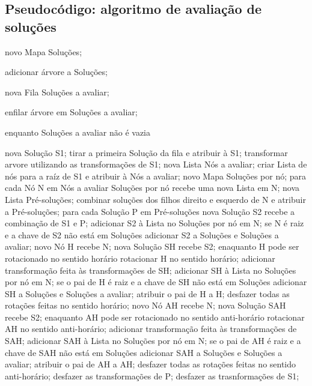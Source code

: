 \begin{anexosenv}

\partanexos

\chapter{Pseudocódigo: algoritmo de avaliação de soluções}

novo Mapa Soluções;

adicionar árvore a Soluções;

nova Fila Soluções a avaliar;

enfilar árvore em Soluções a avaliar;

enquanto Soluções a avaliar não é vazia {

	nova Solução S1;
	tirar a primeira Solução da fila e atribuir à S1;
	transformar arvore utilizando as transformações de S1;
	nova Lista Nós a avaliar;
	criar Lista de nós para a raíz de S1 e atribuir à Nós a avaliar;
	novo Mapa Soluções por nó;
	para cada Nó N em Nós a avaliar {
		Soluções por nó recebe uma nova Lista em N;
		nova Lista Pré-soluções;
		combinar soluções dos filhos direito e esquerdo de N
			e atribuir a Pré-soluções;
		para cada Solução P em Pré-soluções {
			nova Solução S2 recebe a combinação de S1 e P;
			adicionar S2 à Lista no Soluções por nó em N;
			se N é raiz e a chave de S2 não está em Soluções {
				adicionar S2 a Soluções e Soluções a avaliar;
			}
			novo Nó H recebe N;
			nova Solução SH recebe S2;
			enaquanto H pode ser rotacionado no sentido horário {
				rotacionar H no sentido horário;
				adicionar transformação feita às transformações de SH;
				adicionar SH à Lista no Soluções por nó em N;
				se o pai de H é raiz e a chave de SH não está em Soluções {
					adicionar SH a Soluções e Soluções a avaliar;
				}
				atribuir o pai de H a H;
			}
			desfazer todas as rotações feitas no sentido horário;
			novo Nó AH recebe N;
			nova Solução SAH recebe S2;
			enaquanto AH pode ser rotacionado no sentido anti-horário {
				rotacionar AH no sentido anti-horário;
				adicionar transformação feita às transformações de SAH;
				adicionar SAH à Lista no Soluções por nó em N;
				se o pai de AH é raiz e a chave de SAH não está em Soluções {
					adicionar SAH a Soluções e Soluções a avaliar;
				}
				atribuir o pai de AH a AH;
			}
			desfazer todas as rotações feitas no sentido anti-horário;
			desfazer as transformações de P;
		}
	}
	desfazer as trasnformações de S1;
}


\end{anexosenv}
